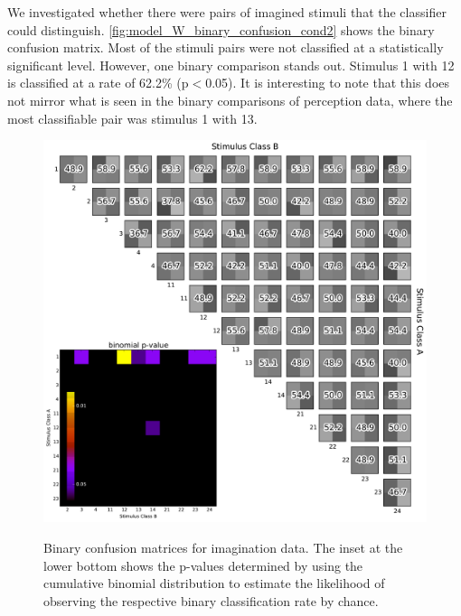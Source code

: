We investigated whether there were pairs of imagined stimuli that the classifier could distinguish.
\autoref{fig:model_W_binary_confusion_cond2} shows the binary confusion matrix.
Most of the stimuli pairs were not classified at a statistically significant level. 
However, one binary comparison stands out. 
Stimulus 1 with 12 is classified at a rate of 62.2\% (p$<$0.05). 
It is interesting to note that this does not mirror what is seen in the binary comparisons of perception data, where the most classifiable pair was stimulus 1 with 13. 
\begin{figure}[h] 
  \begin{center}
    \includegraphics[width=.75\textwidth,keepaspectratio=true]{Figures/model_W_binary_confusion_cond2}
   \\\vspace{-0.8em}
    \caption{Binary confusion matrices for imagination data.
    The inset at the lower bottom shows the p-values determined by using the cumulative binomial distribution to estimate the likelihood of observing the respective binary classification rate by chance.}
    \label{fig:model_W_binary_confusion_cond2}
  \end{center}
  \vspace{-1em}
\end{figure}
\newpage
